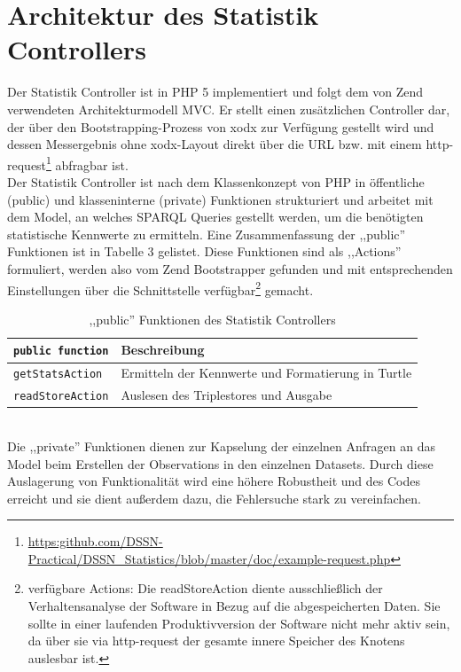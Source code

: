 \documentclass{article}
\begin{document}
\section{Architektur des Statistik Controllers}
Der Statistik Controller ist in PHP 5 implementiert und folgt dem von Zend verwendeten Architekturmodell MVC. Er stellt einen zusätzlichen Controller dar, der über den Bootstrapping-Prozess von xodx zur Verfügung gestellt wird und dessen Messergebnis ohne xodx-Layout direkt über die URL bzw. mit einem http-request\footnote{\url{https:github.com/DSSN-Practical/DSSN\_Statistics/blob/master/doc/example-request.php}} abfragbar ist.\\
Der Statistik Controller ist nach dem Klassenkonzept von PHP in öffentliche (public) und klasseninterne (private) Funktionen strukturiert und arbeitet mit dem Model, an welches SPARQL Queries gestellt werden, um die benötigten statistische Kennwerte zu ermitteln. Eine Zusammenfassung der ,,public'' Funktionen ist in Tabelle 3 gelistet. \newpage
Diese Funktionen sind als ,,Actions'' formuliert, werden also vom Zend Bootstrapper gefunden und mit entsprechenden Einstellungen über die Schnittstelle verfügbar\footnote{verfügbare Actions: Die readStoreAction diente ausschließlich der Verhaltensanalyse der Software in Bezug auf die abgespeicherten Daten. Sie sollte in einer laufenden Produktivversion der Software nicht mehr aktiv sein, da über sie via http-request der gesamte innere Speicher des Knotens auslesbar ist.} gemacht.\\
\begin{table}[ht]
\centering
\label{table3}
\begin{tabular}{|l|l|}
\hline
\texttt{public function} & Beschreibung \\ \hline
\texttt{getStatsAction}       & Ermitteln der Kennwerte und Formatierung in Turtle 	\\ \hline
\texttt{readStoreAction}      & Auslesen des Triplestores und Ausgabe	\\ \hline
\end{tabular}
\caption{,,public'' Funktionen des Statistik Controllers}
\end{table}\\
Die ,,private'' Funktionen dienen zur Kapselung der einzelnen Anfragen an das Model beim Erstellen der Observations in den einzelnen Datasets. Durch diese Auslagerung von Funktionalität wird eine höhere Robustheit und des Codes erreicht und sie dient außerdem dazu, die Fehlersuche stark zu vereinfachen.
\end{document}
